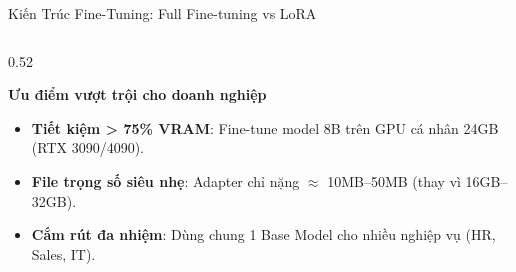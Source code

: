 \documentclass[aspectratio=169, 10pt]{beamer}
\begin{document}
\begin{frame}{Kiến Trúc Fine-Tuning: Full Fine-tuning vs LoRA}
\begin{columns}[T]
\begin{column}{0.52\textwidth}
    \vspace{0.2em}
    \begin{exampleblock}{\textbf{Ưu điểm vượt trội cho doanh nghiệp}}
      \small
      \begin{itemize}\setlength{\itemsep}{2pt}
        \item \textbf{Tiết kiệm > 75\% VRAM}: Fine-tune model 8B trên GPU cá nhân 24GB (RTX 3090/4090).
        \item \textbf{File trọng số siêu nhẹ}: Adapter chỉ nặng $\approx$ 10MB--50MB (thay vì 16GB--32GB).
        \item \textbf{Cắm rút đa nhiệm}: Dùng chung 1 Base Model cho nhiều nghiệp vụ (HR, Sales, IT).
      \end{itemize}
    \end{exampleblock}
  \end{column}
\end{columns}
\end{frame}
\end{document}
